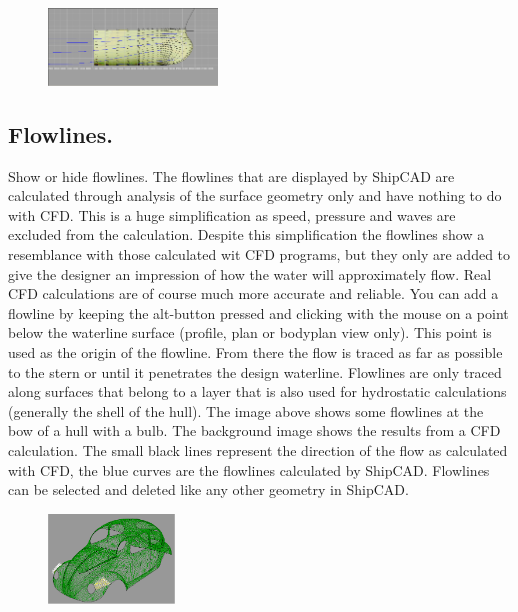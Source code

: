 \documentclass[12pt]{article}
\begin{document}
\begin{figure}
        \centering
        \includegraphics[width=0.4\textwidth,natwidth=693,natheight=318]{flowlines.png}
        \caption{}
        \label{fig:flowlines}
\end{figure}

\subsection{Flowlines.}
Show or hide flowlines. The flowlines that are displayed by ShipCAD
are calculated through analysis of the surface geometry only and have
nothing to do with CFD. This is a huge simplification as speed,
pressure and waves are excluded from the calculation. Despite this
simplification the flowlines show a resemblance with those calculated
wit CFD programs, but they only are added to give the designer an
impression of how the water will approximately flow. Real CFD
calculations are of course much more accurate and reliable. You can
add a flowline by keeping the alt-button pressed and clicking with the
mouse on a point below the waterline surface (profile, plan or
bodyplan view only). This point is used as the origin of the
flowline. From there the flow is traced as far as possible to the
stern or until it penetrates the design waterline. Flowlines are only
traced along surfaces that belong to a layer that is also used for
hydrostatic calculations (generally the shell of the hull). The image
above shows some flowlines at the bow of a hull with a bulb. The
background image shows the results from a CFD calculation. The small
black lines represent the direction of the flow as calculated with
CFD, the blue curves are the flowlines calculated by
ShipCAD. Flowlines can be selected and deleted like any other geometry
in ShipCAD.

\begin{figure}
        \centering
        \includegraphics[width=0.3\textwidth,natwidth=437,natheight=309]{normals.png}
        \caption{}
        \label{fig:normals}
\end{figure}
\end{document}
